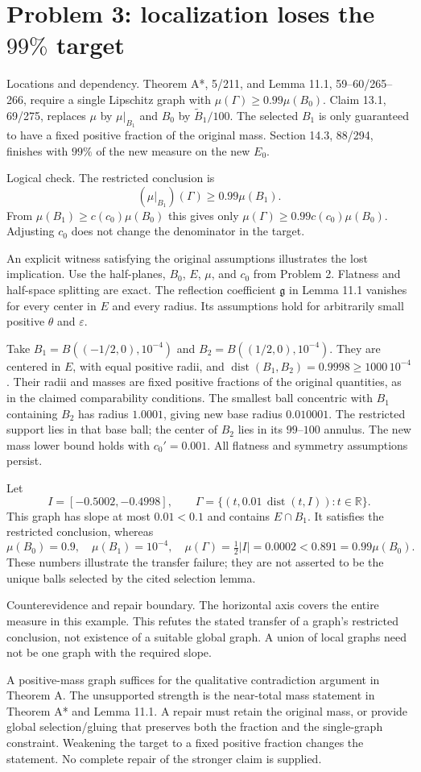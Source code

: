 \documentclass[10pt]{article}
\begin{document}
\section*{Problem 3: localization loses the \(99\%\) target}
Locations and dependency. Theorem A*, 5/211, and Lemma 11.1, 59–60/265–266, require a single Lipschitz graph with \(\mu(\Gamma)\ge0.99\mu(B_0)\). Claim 13.1, 69/275, replaces \(\mu\) by \(\mu|_{B_1}\) and \(B_0\) by \(\widetilde B_1/100\). The selected \(B_1\) is only guaranteed to have a fixed positive fraction of the original mass. Section 14.3, 88/294, finishes with \(99\%\) of the new measure on the new \(E_0\).\par
Logical check. The restricted conclusion is \[(\mu|_{B_1})(\Gamma)\ge0.99\mu(B_1).\] From \(\mu(B_1)\ge c(c_0)\mu(B_0)\) this gives only \(\mu(\Gamma)\ge0.99c(c_0)\mu(B_0)\). Adjusting \(c_0\) does not change the denominator in the target.\par
An explicit witness satisfying the original assumptions illustrates the lost implication. Use the half-planes, \(B_0\), \(E\), \(\mu\), and \(c_0\) from Problem 2. Flatness and half-space splitting are exact. The reflection coefficient \(\mathfrak g\) in Lemma 11.1 vanishes for every center in \(E\) and every radius. Its assumptions hold for arbitrarily small positive \(\theta\) and \(\varepsilon\).\par
Take \(B_1=B((-1/2,0),10^{-4})\) and \(B_2=B((1/2,0),10^{-4})\). They are centered in \(E\), with equal positive radii, and \(\operatorname{dist}(B_1,B_2)=0.9998\ge1000\,10^{-4}\). Their radii and masses are fixed positive fractions of the original quantities, as in the claimed comparability conditions. The smallest ball concentric with \(B_1\) containing \(B_2\) has radius \(1.0001\), giving new base radius \(0.010001\). The restricted support lies in that base ball; the center of \(B_2\) lies in its \(99\)–\(100\) annulus. The new mass lower bound holds with \(c_0'=0.001\). All flatness and symmetry assumptions persist.\par
Let \[I=[-0.5002,-0.4998],\qquad
 \Gamma=\{(t,0.01\,\operatorname{dist}(t,I)):t\in\mathbb R\}.\] This graph has slope at most \(0.01<0.1\) and contains \(E\cap B_1\). It satisfies the restricted conclusion, whereas \[\mu(B_0)=0.9,\quad\mu(B_1)=10^{-4},\quad
 \mu(\Gamma)=\tfrac12|I|=0.0002<0.891=0.99\mu(B_0).\] These numbers illustrate the transfer failure; they are not asserted to be the unique balls selected by the cited selection lemma.\par
Counterevidence and repair boundary. The horizontal axis covers the entire measure in this example. This refutes the stated transfer of a graph’s restricted conclusion, not existence of a suitable global graph. A union of local graphs need not be one graph with the required slope.\par
A positive-mass graph suffices for the qualitative contradiction argument in Theorem A. The unsupported strength is the near-total mass statement in Theorem A* and Lemma 11.1. A repair must retain the original mass, or provide global selection/gluing that preserves both the fraction and the single-graph constraint. Weakening the target to a fixed positive fraction changes the statement. No complete repair of the stronger claim is supplied.\par
\end{document}
